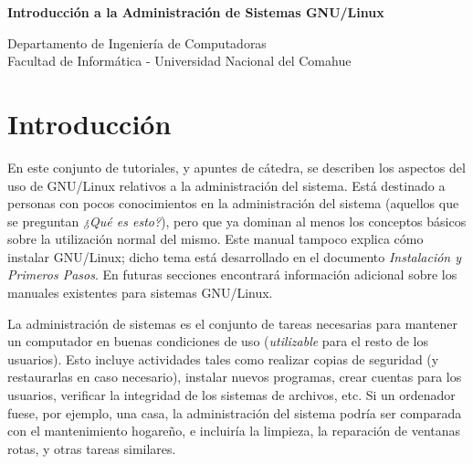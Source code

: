 \documentclass[12pt]{article}
\def\maketitle{

 \makeatletter
 {\color{bl} \centering \huge \sc \textbf{
Introducción a la Administración de Sistemas GNU/Linux \\
 \vspace*{8pt} }\par}
 \makeatother


 \makeatletter
 {\centering \small 
 	Departamento de Ingeniería de Computadoras \\
 	Facultad de Informática - Universidad Nacional del Comahue \\
 	\vspace{20pt} }
 \makeatother

}
\begin{document}
\thispagestyle{empty}
\maketitle
\setlength{\parindent}{0pt}




\section{Introducción}

En este conjunto de tutoriales, y apuntes de cátedra,
se describen los aspectos del uso de GNU/Linux relativos a la administración del
sistema. Está destinado a personas con pocos conocimientos en la
administración del sistema (aquellos que se preguntan \textit{¿Qué es esto?}), pero que ya dominan
al menos los conceptos básicos sobre la utilización normal del mismo. Este
manual tampoco explica cómo instalar GNU/Linux; dicho tema está desarrollado en
el documento \textit{Instalación y Primeros Pasos}. En futuras secciones encontrará información
adicional sobre los manuales existentes para sistemas GNU/Linux.  

La administración de sistemas es el conjunto de tareas necesarias para
mantener un computador en buenas condiciones de uso (\textit{utilizable} para el resto
de los usuarios). Esto incluye actividades
tales como realizar copias de seguridad (y restaurarlas en caso necesario),
instalar nuevos programas, crear cuentas para los usuarios,
verificar la integridad de los sistemas de archivos, etc. Si un ordenador
fuese, por ejemplo, una casa, la administración del sistema podría ser comparada
con el 
mantenimiento hogareño, e incluiría la limpieza, la reparación de ventanas rotas, y otras
tareas similares.  

\end{document}

